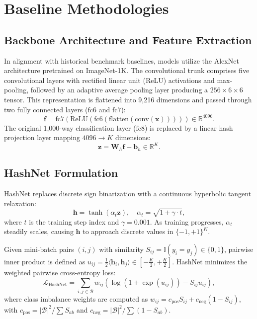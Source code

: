 \documentclass[10pt,conference]{IEEEtran}
\begin{document}
\section{Baseline Methodologies}

\subsection{Backbone Architecture and Feature Extraction}
In alignment with historical benchmark baselines, models utilize the AlexNet architecture \cite{krizhevsky2012imagenet} pretrained on ImageNet-1K. The convolutional trunk comprises five convolutional layers with rectified linear unit (ReLU) activations and max-pooling, followed by an adaptive average pooling layer producing a $256 \times 6 \times 6$ tensor. This representation is flattened into 9,216 dimensions and passed through two fully connected layers ($\text{fc6}$ and $\text{fc7}$):
\begin{equation}
    \mathbf{f} = \text{fc7}\left(\text{ReLU}\left(\text{fc6}(\text{flatten}(\text{conv}(\mathbf{x})))\right)\right) \in \mathbb{R}^{4096}.
\end{equation}
The original 1,000-way classification layer ($\text{fc8}$) is replaced by a linear hash projection layer mapping $4096 \to K$ dimensions:
\begin{equation}
    \mathbf{z} = \mathbf{W}_h \mathbf{f} + \mathbf{b}_h \in \mathbb{R}^K.
\end{equation}

\subsection{HashNet Formulation}
HashNet \cite{cao2017hashnet} replaces discrete sign binarization with a continuous hyperbolic tangent relaxation:
\begin{equation}
    \mathbf{h} = \tanh(\alpha_t \mathbf{z}), \quad \alpha_t = \sqrt{1 + \gamma \cdot t},
\end{equation}
where $t$ is the training step index and $\gamma = 0.001$. As training progresses, $\alpha_t$ steadily scales, causing $\mathbf{h}$ to approach discrete values in $\{-1, +1\}^K$.

Given mini-batch pairs $(i, j)$ with similarity $S_{ij} = \mathbb{I}(y_i = y_j) \in \{0, 1\}$, pairwise inner product is defined as $u_{ij} = \frac{1}{2} \langle \mathbf{h}_i, \mathbf{h}_j \rangle \in [-\frac{K}{2}, +\frac{K}{2}]$. HashNet minimizes the weighted pairwise cross-entropy loss:
\begin{equation}
    \mathcal{L}_{\text{HashNet}} = \sum_{i,j \in \mathcal{B}} w_{ij} \left( \log\left(1 + \exp(u_{ij})\right) - S_{ij} u_{ij} \right),
\end{equation}
where class imbalance weights are computed as $w_{ij} = c_{\text{pos}} S_{ij} + c_{\text{neg}} (1 - S_{ij})$, with $c_{\text{pos}} = |\mathcal{B}|^2 / \sum S_{ab}$ and $c_{\text{neg}} = |\mathcal{B}|^2 / \sum (1 - S_{ab})$.
\end{document}
